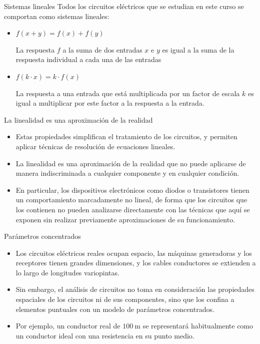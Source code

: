 \documentclass[aspectratio=169, usenames,svgnames,dvipsnames]{beamer}
\begin{document}
\begin{frame}[label={sec:org4f73981}]{Sistemas lineales}
Todos los circuitos eléctricos que se estudian en este curso se comportan como \alert{sistemas lineales}: 

\begin{itemize}
\item \(f(x + y) = f(x) + f(y)\)

La respuesta \(f\) a la suma de dos entradas \(x\) e \(y\) es igual a la suma de la respuesta individual a cada una de las entradas
\item \(f(k \cdot x) = k \cdot f(x)\)

La respuesta a una entrada que está multiplicada por un factor de escala \(k\) es igual a multiplicar por este factor a la respuesta a la entrada.
\end{itemize}
\end{frame}
\begin{frame}[label={sec:orgf61008a}]{La linealidad es una aproximación de la realidad}
\begin{itemize}
\item Estas propiedades simplifican el tratamiento de los circuitos, y \alert{permiten aplicar técnicas de resolución de ecuaciones lineales}.
\item La linealidad es una \alert{aproximación de la realidad} que no puede aplicarse de manera indiscriminada a cualquier componente y en cualquier condición.
\item En particular, los \alert{dispositivos electrónicos} como diodos o transistores tienen un \alert{comportamiento} marcadamente \alert{no lineal}, de forma que los circuitos que los contienen no pueden analizarse directamente con las técnicas que aquí se exponen sin realizar previamente aproximaciones de su funcionamiento.
\end{itemize}
\end{frame}
\begin{frame}[label={sec:orga635519}]{Parámetros concentrados}
\begin{itemize}
\item Los circuitos eléctricos reales ocupan espacio, las máquinas generadoras y los receptores tienen grandes dimensiones, y los cables conductores se extienden a lo largo de longitudes variopintas.
\item Sin embargo, el análisis de circuitos no toma en consideración las propiedades espaciales de los circuitos ni de sus componentes, sino que los confina a elementos puntuales con un modelo de \alert{parámetros concentrados}.
\item Por ejemplo, un conductor real de \(\SI{100}{\meter}\) se representará habitualmente como un conductor ideal con una resistencia en su punto medio.
\end{itemize}
\end{frame}
\end{document}

